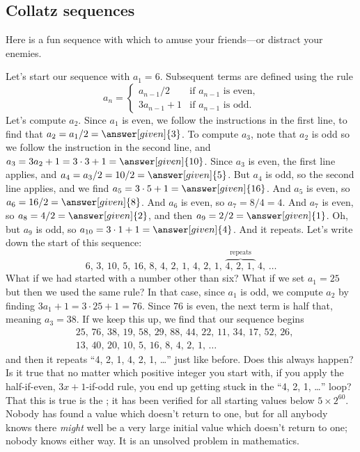 \documentclass{ximera}
\begin{document}
\subsection{Collatz sequences}

Here is a fun sequence with which to amuse your friends---or distract
your enemies.

\begin{example}
  Let's start our sequence with $a_1 = 6$.  Subsequent terms are
  defined using the rule
  \[
  a_n =
  \begin{cases}
    a_{n-1} / 2 &\text{if $a_{n-1}$ is even,} \\
    3a_{n-1} + 1 &\text{if $a_{n-1}$ is odd.}
  \end{cases}
  \]
  Let's compute $a_2$.  Since $a_1$ is even, we follow the
  instructions in the first line, to find that $a_2 = a_1/2 =
  \answer[given]{3}$. To compute $a_3$, note that $a_2$ is odd so we
  follow the instruction in the second line, and $a_3 = 3 a_2 + 1 = 3
  \cdot 3 + 1 = \answer[given]{10}$.  Since $a_3$ is even, the first
  line applies, and $a_4 = a_3 / 2 = 10 / 2 = \answer[given]{5}$.  But
  $a_4$ is odd, so the second line applies, and we find $a_5 = 3 \cdot
  5 + 1 = \answer[given]{16}$.  And $a_5$ is even, so $a_6 = 16 / 2 =
  \answer[given]{8}$.  And $a_6$ is even, so $a_7 = 8/4 = 4$.  And
  $a_7$ is even, so $a_8 = 4 / 2 = \answer[given]{2}$, and then $a_9 =
  2/2 = \answer[given]{1}$.  Oh, but $a_9$ is odd, so $a_{10} = 3
  \cdot 1 + 1 = \answer[given]{4}$.  And it repeats.  Let's write down
  the start of this sequence:
  \[
  6,\, %
  3,\, %
  10,\,  %
  5,\,  %
  16,\,  %
  8,\,  %
  4,\,  %
  2,\,  %
  1,\,  %
  4,\, %
  2,\, %
  1,\, %
  \overbrace{4,\, %
    2,\, %
    1,}^{\text{repeats}}\, %
  4,\, %
  \ldots
  \]
  What if we had started with a number other than six?  What if we set
  $a_1 = 25$ but then we used the same rule?  In that case, since
  $a_1$ is odd, we compute $a_2$ by finding $3 a_1 + 1 = 3 \cdot 25 +
  1 = 76$.  Since $76$ is even, the next term is half that, meaning
  $a_3 = 38$.  If we keep this up, we find that our sequence begins
  \begin{align*}
    &25,\, 76,\, 38,\, 19,\, 58,\, 29,\, 88,\, 44,\, 22,\, 11,\, 34,\, 17,\, 52,\, 26, \\
    &13,\, 40,\, 20,\, 10,\, 5,\, 16,\, 8,\, 4,\, 2, \, 1, \, \ldots
  \end{align*}
  and then it repeats ``4, 2, 1, 4, 2, 1, \ldots'' just like before.
  Does this always happen?  Is it true that no matter which positive
  integer you start with, if you apply the half-if-even, $3x+1$-if-odd
  rule, you end up getting stuck in the ``4, 2, 1, \ldots'' loop?
  That this is true is the ; it has been
  verified for all starting values below $5 \times 2^{60}$.  Nobody
  has found a value which doesn't return to one, but for all anybody
  knows there \textit{might} well be a very large initial value which
  doesn't return to one; nobody knows either way.  It is an unsolved
  problem in mathematics.
\end{example}
\end{document}
